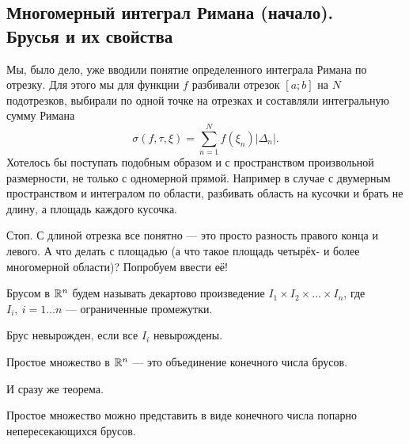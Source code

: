 	\subsection{Многомерный интеграл Римана (начало). \\Брусья и их свойства}
	Мы, было дело, уже вводили понятие определенного интеграла Римана по отрезку. Для этого мы для функции $f$ разбивали отрезок $[a; b]$ на $N$ подотрезков, выбирали по одной точке на отрезках и составляли интегральную сумму Римана
	$$
		\sigma(f, \tau, \xi) = \sum\limits_{n =1}^{N}f(\xi_n)|\Delta_n|.
	$$
	Хотелось бы поступать подобным образом и с пространством произвольной размерности, не только с одномерной прямой. Например в случае с двумерным пространством и интегралом по области, разбивать область на кусочки и брать не длину, а площадь каждого кусочка. 
	\par Стоп. С длиной отрезка все понятно --- это просто разность правого конца и левого. А что делать с площадью (а что такое площадь четырёх- и более многомерной области)? Попробуем ввести её!
	\begin{Def}
		Брусом в $\mathbb{R}^n$ будем называть декартово произведение $I_1\times I_2\times\ldots \times I_n$, где $I_i,\ i = 1\dots n$ --- ограниченные промежутки.
	\end{Def}
	Брус невырожден, если все $I_i$ невырождены.
	\begin{Def}
		Простое множество в $\mathbb{R}^n$ --- это объединение конечного числа брусов. 
	\end{Def}
	И сразу же теорема.
	\begin{Theorem}
		Простое множество можно представить в виде конечного числа попарно непересекающихся брусов.
	\end{Theorem} 
